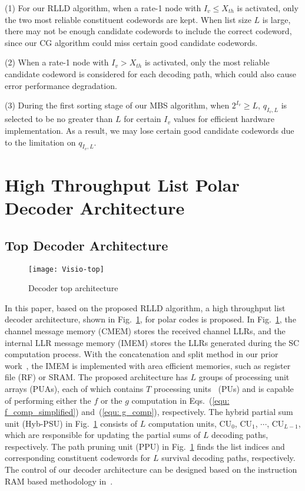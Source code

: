 \documentclass[journal]{IEEEtran}
\begin{document}
(1) For our RLLD algorithm, when a rate-1 node with $I_v \leqslant X_{th}$ is activated, only the two most reliable constituent codewords are kept. When list size $L$ is large, there may not be enough candidate codewords to include the correct codeword, since our CG algorithm could miss certain good candidate codewords.

(2) When a rate-1 node with $I_v> X_{th}$ is activated, only the most reliable candidate codeword is considered for each decoding path, which could also cause error performance degradation.

(3) During the first sorting stage of our MBS algorithm, when $2^{I_v} \geqslant L$, $q_{I_v,L}$ is selected to be no greater than $L$ for certain $I_v$ values for efficient hardware implementation. As a result, we may lose certain good candidate codewords due to the limitation on $q_{I_v,L}$.


\section{High Throughput List Polar Decoder Architecture} \label{sec: llldec}
\subsection{Top Decoder Architecture} \label{ssec: top_archi}

\begin{figure} [hbt]
\centering
\texttt{[image: Visio-top]}
  \caption{Decoder top architecture}\label{fig: dec_top}
\end{figure}

In this paper, based on the proposed RLLD algorithm, a high throughput list decoder architecture, shown in Fig.~\ref{fig: dec_top}, for polar codes is proposed. In Fig.~\ref{fig: dec_top}, the channel message memory (CMEM) stores the received channel LLRs, and the internal LLR message memory (IMEM) stores the LLRs generated during the SC computation process. With the concatenation and split method in our prior work~\cite{jun_low_mem_list}, the IMEM is implemented with area efficient memories, such as register file (RF) or SRAM. The proposed architecture has $L$ groups of processing unit arrays (PUAs), each of which contains $T$ processing units~\cite{gross_polar1} (PUs) and is capable of performing either the $f$ or the $g$ computation in Eqs.~(\ref{equ: f_comp_simplified}) and~(\ref{equ: g_comp}), respectively. The hybrid partial sum unit (Hyb-PSU) in Fig.~\ref{fig: dec_top} consists of $L$ computation units, CU$_0$, CU$_1$, $\cdots$, CU$_{L-1}$, which are responsible for updating the partial sums of $L$ decoding paths, respectively. The path pruning unit (PPU) in Fig.~\ref{fig: dec_top} finds the list indices and corresponding constituent codewords for $L$ survival decoding paths, respectively. The control of our decoder architecture can be designed based on the instruction RAM based methodology in~\cite{fast_polar_SC_gross}.
\end{document}
